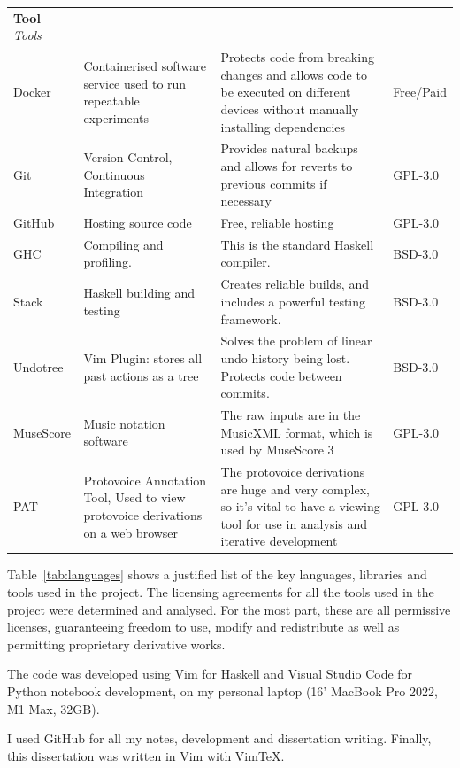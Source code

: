 \documentclass[12pt,a4paper,twoside,openany]{report} \usepackage[pdfborder={0 0 0}]{hyperref}    %
\theoremstyle{definition} \newtheorem{definition}{Definition}[section]
\begin{document}
\begin{table}[ht!]
\begin{tabularx}{\textwidth}{p{4em}X X p{4em}} {\normalsize \textbf{Tool}}
        \textit{Tools} &&&\\ Docker & Containerised software service used to run repeatable experiments
                       & Protects code from breaking changes and allows code to be executed on
        different devices without manually installing dependencies & Free/Paid \\ Git & Version Control, Continuous Integration & Provides natural backups and
        allows for reverts to previous commits if necessary & GPL-3.0 \\ GitHub & Hosting source code & Free, reliable
        hosting & GPL-3.0 \\ GHC & Compiling and profiling. & This is the standard Haskell compiler. & BSD-3.0 \\ Stack
                & Haskell building and testing  & Creates reliable builds, and includes a powerful testing framework.
                & BSD-3.0 \\ Undotree & Vim Plugin: stores all past actions as a tree & Solves the problem of linear
        undo history being lost. Protects code between commits. & BSD-3.0 \\ MuseScore & Music notation software & The
        raw inputs are in the MusicXML format, which is used by MuseScore 3 & GPL-3.0 \\ PAT & Protovoice Annotation
        Tool, Used to view protovoice derivations on a web browser & The protovoice derivations are huge and very
      complex, so it's vital to have a viewing tool for use in analysis and iterative development & GPL-3.0 \\
    \end{tabularx} 
  \end{table}

    Table~\ref{tab:languages} shows a justified list of the key languages, libraries and tools used in the project. The
    licensing agreements for all the tools used in the project were determined and analysed. For the most part, these
    are all permissive licenses, guaranteeing freedom to use, modify and redistribute as well as permitting proprietary
    derivative works. 

    The code was developed using Vim for Haskell and Visual Studio Code for Python notebook development, on my personal laptop (16' MacBook Pro 2022, M1 Max, 32GB). 

    I used GitHub for all my notes, development and dissertation writing. Finally, this dissertation was written in Vim with VimTeX.
\end{document}
